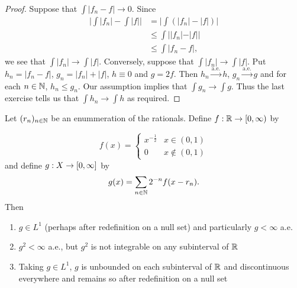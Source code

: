 \documentclass{book}
\begin{document}
	\begin{proof}
		Suppose that $\int |f_n - f| \rightarrow 0$. Since 
		\begin{align*}
			\bigg|\int |f_n| - \int |f|\bigg| 
			&= \bigg|\int (|f_n| - |f|)\bigg|\\
			&\leq \int ||f_n| - |f||\\
			&\leq \int |f_n - f|,
		\end{align*}
		we see that $\int |f_n| \rightarrow \int |f|$. Conversely, suppose that $\int |f_n| \rightarrow \int |f|$. Put $h_n = |f_n-f|$,  $g_n = |f_n| + |f|$, $h \equiv 0$ and $g = 2f$. Then $h_n \xrightarrow{\text{a.e.}} h$, $g_n \xrightarrow{\text{a.e.}} g$ and for each $n \in \mathbb{N}$, $h_n \leq g_n$. Our assumption implies that $\int g_n \rightarrow \int g$. Thus the last exercise tells us that $\int h_n \rightarrow \int h$ as required. 
		
	\end{proof}
	
	\begin{ex}  
		Let $(r_n)_{n \in \mathbb{N}}$ be an enummeration of the rationals. Define $f: \mathbb{R} \rightarrow [0,\infty)$ by 
		
		\[ f(x) = \begin{cases} 
			x^{-\frac{1}{2}} & x \in (0,1) \\
			0 & x \not\in (0,1)
		\end{cases}
		\]
		and define $g: X \rightarrow [0,\infty]$ by 
		$$g(x) = \sum_{n \in \mathbb{N}}2^{-n}f(x -r_n).$$
		Then 
		\begin{enumerate}
			\item $g \in L^1$ (perhaps after redefinition on a null set) and particularly $g < \infty$ a.e. 
			\item $g^2 < \infty$ a.e., but $g^2$ is not integrable on any subinterval of $\mathbb{R}$
			\item Taking $g \in L^1$, $g$ is unbounded on each subinterval of $\mathbb{R}$ and discontinuous everywhere and remains so after redefinition on a null set
		\end{enumerate}
	\end{ex}
	
\end{document}
